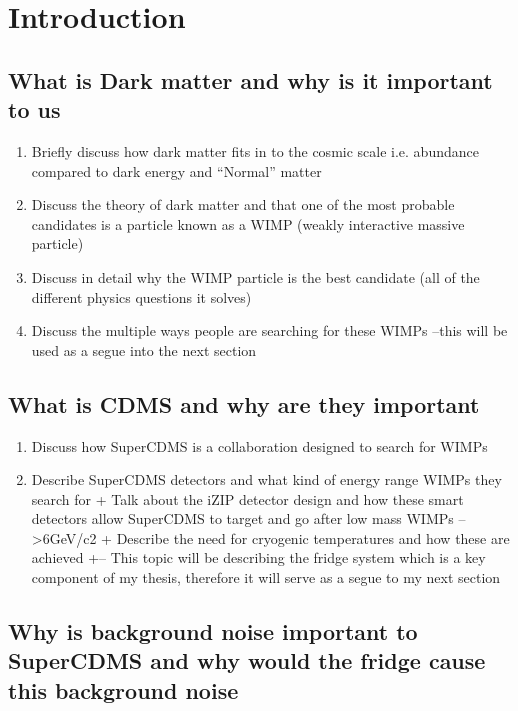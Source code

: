 \section{Introduction}
\subsection{What is Dark matter and why is it important to us}

\begin{enumerate}
    \item Briefly discuss how dark matter fits in to the cosmic scale i.e. abundance compared to dark energy and “Normal” matter
    \item Discuss the theory of dark matter and that one of the most probable candidates is a particle known as a WIMP (weakly interactive massive particle)
    \item Discuss in detail why the WIMP particle is the best candidate (all of the different physics questions it solves)
    \item Discuss the multiple ways people are searching for these WIMPs –this will be used as a segue into the next section
\end{enumerate}

\subsection{What is CDMS and why are they important}

\begin{enumerate}
    \item Discuss how SuperCDMS is a collaboration designed to search for WIMPs
    \item Describe SuperCDMS detectors and what kind of energy range WIMPs they search for 
        + Talk about the iZIP detector design and how these smart detectors allow SuperCDMS to target and go after low mass WIMPs –   >6GeV/c2
        + Describe the need for cryogenic temperatures and how these are achieved
        +--	This topic will be describing the fridge system which is a key component of my thesis, therefore it will serve as a segue to my next section 
\end{enumerate}

\subsection{	Why is background noise important to SuperCDMS and why would the fridge cause this background noise}
\cite{pyle2012}

